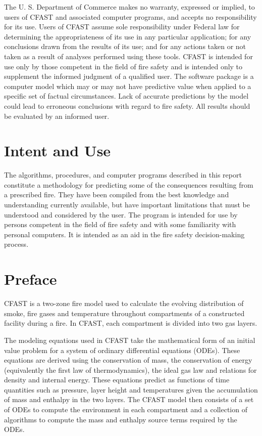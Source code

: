 \documentclass[12pt]{book}
\begin{document}
The U. S. Department of Commerce makes no warranty, expressed or implied, to users of
CFAST and associated computer programs, and accepts no responsibility for its use.  Users of
CFAST assume sole responsibility under Federal law for determining the appropriateness of its
use in any particular application; for any conclusions drawn from the results of its use; and for
any actions taken or not taken as a result of analyses performed using these tools.
CFAST is intended for use only by those competent in the field of fire safety and is intended
only to supplement the informed judgment of a qualified user. The software package is a
computer model which may or may not have predictive value when applied to a specific set of
factual circumstances. Lack of accurate predictions by the model could lead to erroneous
conclusions with regard to fire safety. All results should be evaluated by an informed user.

\chapter{Intent and Use}

The algorithms, procedures, and computer programs described in this report constitute a
methodology for predicting some of the consequences resulting from a prescribed fire.  They
have been compiled from the best knowledge and understanding currently available, but have
important limitations that must be understood and considered by the user.  The program is
intended for use by persons competent in the field of fire safety and with some familiarity with
personal computers. It is intended as an aid in the fire safety decision-making process.

\chapter{Preface}

CFAST is a two-zone fire model used to calculate the evolving distribution of smoke, fire gases
and temperature throughout compartments of a constructed facility during a fire. In CFAST,
each compartment is divided into two gas layers.

The modeling equations used in CFAST take the mathematical form of an initial value problem
for a system of ordinary differential equations (ODEs). These equations are derived using the
conservation of mass, the conservation of energy (equivalently the first law of thermodynamics),
the ideal gas law and relations for density and internal energy. These equations predict as
functions of time quantities such as pressure, layer height and temperatures given the
accumulation of mass and enthalpy in the two layers. The CFAST model then consists of a set
of ODEs to compute the environment in each compartment and a collection of algorithms to
compute the mass and enthalpy source terms required by the ODEs.
\end{document}
